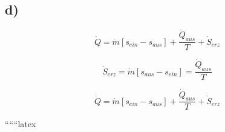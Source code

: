 

\subsection*{d)}

\[
\dot{Q} = \dot{m} \left[ s_{ein} - s_{aus} \right] + \frac{\dot{Q}_{aus}}{T} + \dot{S}_{erz}
\]

\[
\dot{S}_{erz} = \dot{m} \left[ s_{aus} - s_{ein} \right] = \frac{\dot{Q}_{aus}}{T}
\]

\[
\dot{Q} = \dot{m} \left[ s_{ein} - s_{aus} \right] + \frac{\dot{Q}_{aus}}{T} + \dot{S}_{erz}
\]

``````latex